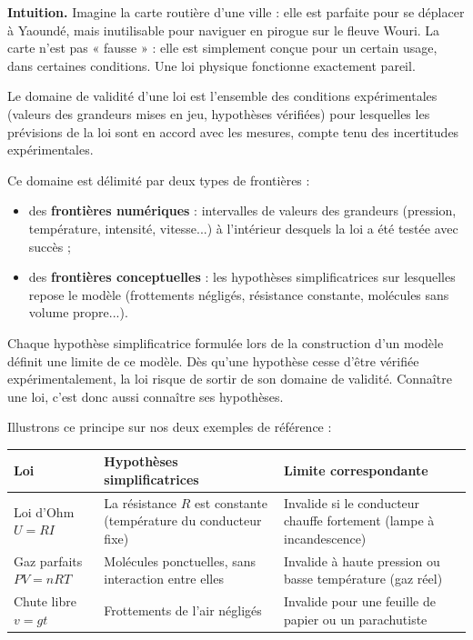 \documentclass[11pt]{article}
\newcommand{\cle}[1]{{\popxbold\color{popdark}#1}}
\newcounter{popsec}
\newcounter{popsub}
\newcommand{\courssub}[1]{%
  \stepcounter{popsub}%
  \par\vspace{9pt}\noindent{\popxbold\fontsize{11.5}{13}\selectfont\color{popink}{\color{poporange}\thepopsec.\thepopsub}\hspace{6pt}#1}\par\nopagebreak\vspace{4pt}
}
\begin{document}
\courssub{Le domaine de validité d'une loi}

\textbf{Intuition.} Imagine la carte routière d'une ville : elle est parfaite pour se déplacer à Yaoundé, mais inutilisable pour naviguer en pirogue sur le fleuve Wouri. La carte n'est pas « fausse » : elle est simplement conçue pour un certain usage, dans certaines conditions. Une loi physique fonctionne exactement pareil.

\begin{definition}
Le \cle{domaine de validité} d'une loi est l'ensemble des conditions expérimentales (valeurs des grandeurs mises en jeu, hypothèses vérifiées) pour lesquelles les prévisions de la loi sont en accord avec les mesures, compte tenu des incertitudes expérimentales.
\end{definition}

Ce domaine est délimité par deux types de frontières :

\begin{itemize}
\item des \textbf{frontières numériques} : intervalles de valeurs des grandeurs (pression, température, intensité, vitesse...) à l'intérieur desquels la loi a été testée avec succès ;
\item des \textbf{frontières conceptuelles} : les hypothèses simplificatrices sur lesquelles repose le modèle (frottements négligés, résistance constante, molécules sans volume propre...).
\end{itemize}

\begin{aretenir}
Chaque hypothèse simplificatrice formulée lors de la construction d'un modèle définit une limite de ce modèle. Dès qu'une hypothèse cesse d'être vérifiée expérimentalement, la loi risque de sortir de son domaine de validité. Connaître une loi, c'est donc aussi connaître ses hypothèses.
\end{aretenir}

Illustrons ce principe sur nos deux exemples de référence :

\begin{center}
\begin{tabularx}{\linewidth}{|l|X|X|}
\hline
\rowcolor{popblueL} \textbf{Loi} & \textbf{Hypothèses simplificatrices} & \textbf{Limite correspondante} \\
\hline
Loi d'Ohm $U = RI$ & La résistance $R$ est constante (température du conducteur fixe) & Invalide si le conducteur chauffe fortement (lampe à incandescence) \\
\hline
Gaz parfaits $PV = nRT$ & Molécules ponctuelles, sans interaction entre elles & Invalide à haute pression ou basse température (gaz réel) \\
\hline
Chute libre $v = gt$ & Frottements de l'air négligés & Invalide pour une feuille de papier ou un parachutiste \\
\hline
\end{tabularx}
\end{center}
\end{document}
